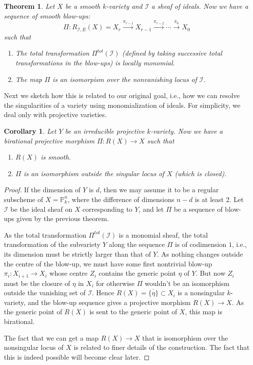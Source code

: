 \documentclass[12pt,a4paper,leqno]{article}
\newcommand{\Proj}{\mathbb{P}}
\theoremstyle{plain}
\newtheorem{thm}[theo]{Theorem}
\newtheorem{cor}[theo]{Corollary}
\theoremstyle{definition}
\theoremstyle{remark}
\begin{document}
\begin{thm}
Let $X$ be a smooth $k$-variety and $\mathscr{I}$ a sheaf of ideals. Now we have a sequence of smooth blow-ups:
\begin{equation*}
\Pi: R_{\mathscr{I},E} (X) = X_r \stackrel{\pi_{r-1}}{\to} X_{r-1} \stackrel{\pi_{r-2}}{\to} \cdots \stackrel{\pi_{0}}{\to} X_0
\end{equation*}
such that 
\begin{enumerate}
\item The total transformation $\Pi^{tot} (\mathscr{I})$ (defined by taking successive total transformations in the blow-ups) is locally monomial.
\item The map $\Pi$ is an isomorpism over the nonvanishing locus of $\mathscr{I}$.
\end{enumerate}
\end{thm} 

Next we sketch how this is related to our original goal, i.e., how we can resolve the singularities of a variety using monomialization of ideals. For simplicity, we deal only with projective varieties.

\begin{cor}
Let $Y$ be an irreducible projective $k$-variety. Now we have a birational projective morphism $\Pi: R(X) \to X$ such that
\begin{enumerate}
\item $R(X)$ is smooth.
\item $\Pi$ is an isomorphism outside the singular locus of $X$ (which is closed).
\end{enumerate}
\end{cor}  
\begin{proof}
If the dimension of $Y$ is $d$, then we may assume it to be a regular subscheme of $X = \Proj^n_k$, where the difference of dimensions $n-d$ is at least 2. Let $\mathscr{I}$ be the ideal sheaf on $X$ corresponding to $Y$, and let $\Pi$ be a sequence of blow-ups given by the previous theorem. 

As the total transformation $\Pi^{tot} (\mathscr{I})$ is a monomial sheaf, the total transformation of the subvariety $Y$ along the sequence $\Pi$ is of codimension $1$, i.e., its dimension must be strictly larger than that of $Y$. As nothing changes outside the centre of the blow-up, we must have some first nontrivial blow-up $\pi_i: X_{i+1} \to X_i$ whose centre $Z_i$ contains the generic point $\eta$ of $Y$. But now $Z_i$ must be the closure of $\eta$ in $X_i$ for otherwise $\Pi$ wouldn't be an isomorphism outside the vanishing set of $\mathscr{I}$. Hence $R(X) = \overline{\{ \eta \}} \subset X_i$ is a nonsingular $k$-variety, and the blow-up sequence gives a projective morphism $R(X) \to X$. As the generic point of $R(X)$ is sent to the generic point of $X$, this map is birational.

The fact that we can get a map $R(X) \to X$ that is isomorphism over the nonsingular locus of $X$ is related to finer details of the construction. The fact that this is indeed possible will become clear later.
\end{proof}
\end{document}
